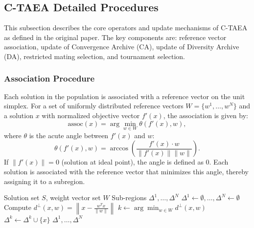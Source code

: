\documentclass[12pt]{article}
\begin{document}
\subsection{C-TAEA Detailed Procedures}

This subsection describes the core operators and update mechanisms of C-TAEA as defined in the original paper. The key components are: reference vector association, update of Convergence Archive (CA), update of Diversity Archive (DA), restricted mating selection, and tournament selection.

\subsubsection{Association Procedure}
Each solution in the population is associated with a reference vector on the unit simplex. For a set of uniformly distributed reference vectors \(W = \{w^1, \dots, w^N\}\) and a solution \(x\) with normalized objective vector \(f'(x)\), the association is given by:
\[
\text{assoc}(x) = \arg\min_{w \in W} \theta(f'(x), w),
\]
where \(\theta\) is the acute angle between \(f'(x)\) and \(w\):
\[
\theta(f'(x), w) = \arccos\left( \frac{f'(x) \cdot w}{\|f'(x)\| \|w\|} \right).
\]
If \(\|f'(x)\| = 0\) (solution at ideal point), the angle is defined as \(0\). Each solution is associated with the reference vector that minimizes this angle, thereby assigning it to a subregion.


\begin{algorithm}
\caption{Association Procedure}
\label{alg:association}
\begin{algorithmic}[1]
\Require Solution set $S$, weight vector set $W$
\Ensure Sub-regions $\Delta^1, \dots, \Delta^N$
\State $\Delta^1 \gets \emptyset, \dots, \Delta^N \gets \emptyset$
        \State Compute $d^\perp(x, w) = \left\| x - \frac{w^T x}{\|w\|} \right\|$
        \EndFor
    \State $k \gets \arg\min_{w \in W} d^\perp(x, w)$
    \State $\Delta^k \gets \Delta^k \cup \{x\}$
    \EndFor
\State \Return $\Delta^1, \dots, \Delta^N$
\end{algorithmic}
\end{algorithm}
\end{document}
